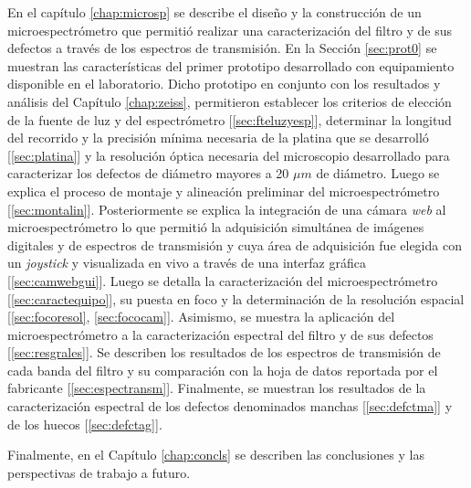 En el capítulo \ref{chap:microsp} se describe el diseño y la construcción de un microespectrómetro que permitió realizar una caracterización del filtro y de sus defectos a través de los espectros de transmisión. En la Sección \ref{sec:prot0} se muestran las características del primer prototipo desarrollado con equipamiento disponible en el laboratorio. Dicho prototipo en conjunto con los resultados y análisis del Capítulo \ref{chap:zeiss}, permitieron establecer los criterios de elección de la fuente de luz y del espectrómetro [\ref{sec:fteluzyesp}], determinar la longitud del recorrido y la precisión mínima necesaria de la platina que se desarrolló [\ref{sec:platina}] y la resolución óptica necesaria del microscopio desarrollado para caracterizar los defectos de diámetro mayores a 20 $\mu m$ de diámetro. Luego se explica el proceso de montaje y alineación preliminar del microespectrómetro [\ref{sec:montalin}]. Posteriormente se explica la integración de una cámara \textit{web} al microespectrómetro lo que permitió la adquisición simultánea de imágenes digitales y de espectros de transmisión y cuya área de adquisición fue elegida con un \textit{joystick} y visualizada en vivo a través de una interfaz gráfica [\ref{sec:camwebgui}]. Luego se detalla la caracterización del microespectrómetro [\ref{sec:caractequipo}], su puesta en foco y la determinación de la resolución espacial [\ref{sec:focoresol}, \ref{sec:fococam}]. Asimismo, se muestra la aplicación del microespectrómetro a la caracterización espectral del filtro y de sus defectos [\ref{sec:resgrales}]. Se describen los resultados de los espectros de transmisión de cada banda del filtro y su comparación con la hoja de datos reportada por el fabricante [\ref{sec:espectransm}]. Finalmente, se muestran los resultados de la caracterización espectral de los defectos denominados manchas [\ref{sec:defctma}] y de los huecos [\ref{sec:defctag}].

Finalmente, en el Capítulo \ref{chap:concls} se describen las conclusiones y las perspectivas de trabajo a futuro.



